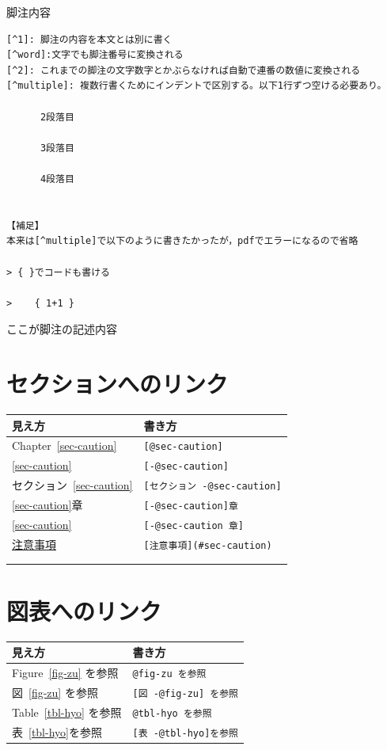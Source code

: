\documentclass[
  b5paper,
  xelatex, ja=standard]{bxjsbook}
\begin{document}
脚注内容

\begin{verbatim}
[^1]: 脚注の内容を本文とは別に書く
[^word]:文字でも脚注番号に変換される 
[^2]: これまでの脚注の文字数字とかぶらなければ自動で連番の数値に変換される
[^multiple]: 複数行書くためにインデントで区別する。以下1行ずつ空ける必要あり。

      2段落目
      
      3段落目
      
      4段落目  


【補足】
本来は[^multiple]で以下のように書きたかったが，pdfでエラーになるので省略

> { }でコードも書ける 

>    { 1+1 }
\end{verbatim}

ここが脚注の記述内容

\section{セクションへのリンク}\label{ux30bbux30afux30b7ux30e7ux30f3ux3078ux306eux30eaux30f3ux30af}

\begin{longtable}[]{@{}ll@{}}
\toprule\noalign{}
見え方 & 書き方 \\
\midrule\noalign{}
\endhead
\bottomrule\noalign{}
\endlastfoot
Chapter~\ref{sec-caution} & \texttt{{[}@sec-caution{]}} \\
\ref{sec-caution} & \texttt{{[}-@sec-caution{]}} \\
セクション~\ref{sec-caution} &
\texttt{{[}セクション\ -@sec-caution{]}} \\
\ref{sec-caution}章 & \texttt{{[}-@sec-caution{]}章} \\
\ref{sec-caution} & \texttt{{[}-@sec-caution\ 章{]}} \\
\hyperref[sec-caution]{注意事項} &
\texttt{{[}注意事項{]}(\#sec-caution)} \\
& \\
& \\
\end{longtable}

\section{図表へのリンク}\label{ux56f3ux8868ux3078ux306eux30eaux30f3ux30af}

\begin{longtable}[]{@{}ll@{}}
\toprule\noalign{}
見え方 & 書き方 \\
\midrule\noalign{}
\endhead
\bottomrule\noalign{}
\endlastfoot
Figure~\ref{fig-zu} を参照 & \texttt{@fig-zu\ を参照} \\
図~\ref{fig-zu} を参照 & \texttt{{[}図\ -@fig-zu{]}\ を参照} \\
Table~\ref{tbl-hyo} を参照 & \texttt{@tbl-hyo\ を参照} \\
表~\ref{tbl-hyo}を参照 & \texttt{{[}表\ -@tbl-hyo{]}を参照} \\
\end{longtable}
\end{document}
